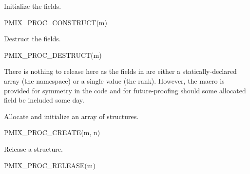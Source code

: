 Initialize the  fields.

\cspecificstart
\begin{codepar}
PMIX_PROC_CONSTRUCT(m)
\end{codepar}
\cspecificend

\begin{arglist}
\end{arglist}


Destruct the  fields.

\cspecificstart
\begin{codepar}
PMIX_PROC_DESTRUCT(m)
\end{codepar}
\cspecificend

\begin{arglist}
\end{arglist}

There is nothing to release here as the fields in  are either a statically-declared array (the namespace) or a single value (the rank). However, the macro is provided for symmetry in the code and for future-proofing should some allocated field be included some day.


Allocate and initialize an array of  structures.

\cspecificstart
\begin{codepar}
PMIX_PROC_CREATE(m, n)
\end{codepar}
\cspecificend

\begin{arglist}
\end{arglist}



Release a  structure.

\cspecificstart
\begin{codepar}
PMIX_PROC_RELEASE(m)
\end{codepar}
\cspecificend

